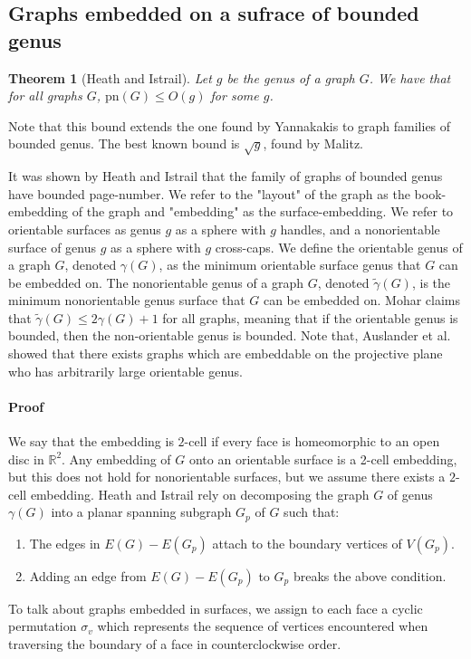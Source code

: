 \documentclass[]{report}
\newcommand{\pn}{\text{pn}}
\newtheorem{theorem}{Theorem}
\theoremstyle{definition}
\numberwithin{theorem}{section}
\numberwithin{equation}{section}
\begin{document}
\subsection{Graphs embedded on a sufrace of bounded genus}\label{ssec:pagenumber_bounded_genus}
\begin{theorem}[Heath and Istrail\cite{heathPagenumberGenusGraphs1992}]\label{thm:Genus_pagenumber_bound}
	Let $g$ be the genus of a graph $G$. We have that for all graphs $G$, $\pn(G) \leq O(g)$ for some $g$.
\end{theorem}
Note that this bound extends the one found by Yannakakis \cite{yannakakisEmbeddingPlanarGraphs1989b} to graph families of bounded genus. 
The best known bound is $\sqrt{g}$, found by Malitz\cite{malitzGenusGraphsHave1994}.

It was shown by Heath and Istrail that the family of graphs of bounded genus have bounded page-number. 
We refer to the "layout" of the graph as the book-embedding of the graph and "embedding" as the surface-embedding. We refer to orientable surfaces as genus $g$ as a sphere with $g$ handles, and a nonorientable surface of genus $g$ as a sphere with $g$ cross-caps. We define the orientable genus of a graph $G$, denoted $\gamma(G)$, as the minimum orientable surface genus that $G$ can be embedded on. The nonorientable genus of a graph $G$, denoted $\tilde{\gamma}(G)$, is the minimum nonorientable genus surface that $G$ can be embedded on. Mohar\cite{moharOrientableGenusGraphs1998} claims that $\tilde{\gamma}(G) \leq 2 \gamma(G) + 1$ for all graphs, meaning that if the orientable genus is bounded, then the non-orientable genus is bounded. Note that, Auslander et al.\cite{auslanderImbeddingGraphsManifolds1963} showed that there exists graphs which are embeddable on the projective plane who has arbitrarily large orientable genus. 
\paragraph{Proof}
We say that the embedding is $2$-cell if every face is homeomorphic to an open disc in $\mathbb{R}^2$. Any embedding of $G$ onto an orientable surface is a 2-cell embedding, but this does not hold for nonorientable surfaces, but we assume there exists a $2$-cell embedding.
Heath and Istrail rely on decomposing the graph $G$ of genus $\gamma(G)$ into a planar spanning subgraph $G_p$ of $G$ such that:
\begin{enumerate}
	\item The edges in $E(G) - E(G_p)$ attach to the boundary vertices of $V(G_p)$. 
	\item Adding an edge from $E(G) - E(G_p)$ to $G_p$ breaks the above condition. 
\end{enumerate}
To talk about graphs embedded in surfaces, we assign to each face a cyclic permutation $\sigma_v$ which represents the sequence of vertices encountered when traversing the boundary of a face in counterclockwise order.
\end{document}
